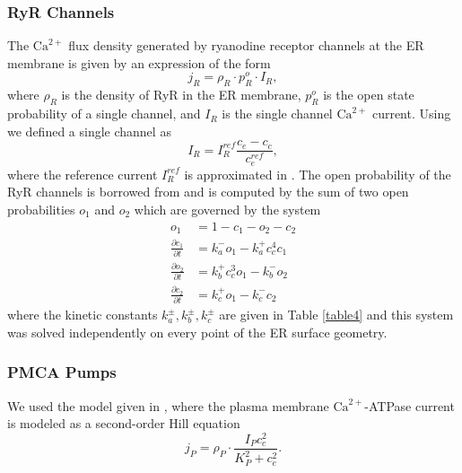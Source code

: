 \documentclass[12pt]{article}
\begin{document}
\subsubsection*{RyR Channels} The $\textrm{Ca}^{2+}$ flux density generated by ryanodine receptor channels at
the ER membrane is given by an expression of the form
\begin{equation}
    j_R=\rho_R\cdot p_R^o\cdot I_R,
\end{equation}
where $\rho_R$ is the density of RyR in the ER membrane, $p_R^o$ is the open state probability of a single channel, and $I_R$ is the single channel $\textrm{Ca}^{2+}$ current. Using \cite{Keizer1996} we defined a single channel as
\begin{equation}
    I_R=I_R^{ref}\frac{c_e-c_c}{c_e^{ref}},
\end{equation}
where the reference current $I_R^{ref}$ is approximated in \cite{Tinker1993}. The open probability of the RyR channels is borrowed from \cite{Keizer1996} and is computed by the sum of two open probabilities $o_1$ and $o_2$ which are governed by the system
\begin{align}
    o_1&=1-c_1-o_2-c_2\\
    \frac{\partial c_1 }{\partial t }&=k_a^-o_1-k_a^+c_c^4c_1\\
    \frac{\partial o_2}{\partial t}&= k_b^+c_c^3o_1-k_b^-o_2\\
    \frac{\partial c_2}{\partial t}&=k_c^+o_1-k_c^-c_2
\end{align}
where the kinetic constants $k_a^\pm,k_b^\pm,k_c^\pm$ are given in Table \ref{table4} and this system was solved independently on every point of the ER surface geometry.
\subsubsection*{PMCA Pumps} We used the model given in \cite{Graupner2003,Graupner2005}, where the plasma membrane $\textrm{Ca}^{2+}$-ATPase current is modeled as a second-order Hill equation
\begin{equation}
    j_P=\rho_P\cdot \frac{I_Pc_c^2}{K_P^2+c_c^2}.
\end{equation}
\end{document}
